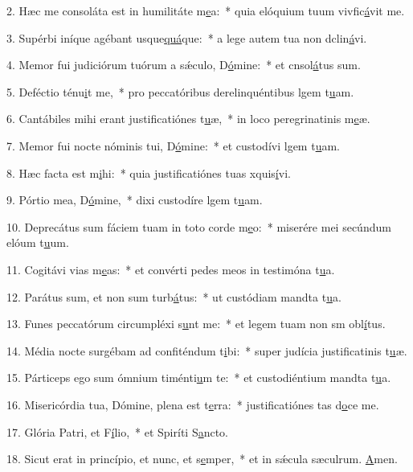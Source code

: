 2. Hæc me consoláta est in humilitáte m\uline{e}a:~* quia elóquium tuum vivfic\uline{á}vit me.\par 
3. Supérbi iníque agébant usque\uline{quá}que:~* a lege autem tua non dclin\uline{á}vi.\par 
4. Memor fui judiciórum tuórum a sǽculo, D\uline{ó}mine:~* et cnsol\uline{á}tus sum.\par 
5. Deféctio ténu\uline{i}t me,~* pro peccatóribus derelinquéntibus lgem t\uline{u}am.\par 
6. Cantábiles mihi erant justificatiónes t\uline{u}æ,~* in loco peregrinatinis m\uline{e}æ.\par 
7. Memor fui nocte nóminis tui, D\uline{ó}mine:~* et custodívi lgem t\uline{u}am.\par 
8. Hæc facta est m\uline{i}hi:~* quia justificatiónes tuas xquis\uline{í}vi.\par 
9. Pórtio mea, D\uline{ó}mine,~* dixi custodíre lgem t\uline{u}am.\par 
10. Deprecátus sum fáciem tuam in toto corde m\uline{e}o:~* miserére mei secúndum elóum t\uline{u}um.\par 
11. Cogitávi vias m\uline{e}as:~* et convérti pedes meos in testimóna t\uline{u}a.\par 
12. Parátus sum, et non sum turb\uline{á}tus:~* ut custódiam mandta t\uline{u}a.\par 
13. Funes peccatórum circumpléxi s\uline{u}nt me:~* et legem tuam non sm obl\uline{í}tus.\par 
14. Média nocte surgébam ad confiténdum t\uline{i}bi:~* super judícia justificatinis t\uline{u}æ.\par 
15. Párticeps ego sum ómnium timénti\uline{u}m te:~* et custodiéntium mandta t\uline{u}a.\par 
16. Misericórdia tua, Dómine, plena est t\uline{e}rra:~* justificatiónes tas d\uline{o}ce me.\par 
17. Glória Patri, et F\uline{í}lio,~* et Spiríti S\uline{a}ncto.\par 
18. Sicut erat in princípio, et nunc, et s\uline{e}mper,~* et in sǽcula sæculrum. \uline{A}men.\par 
